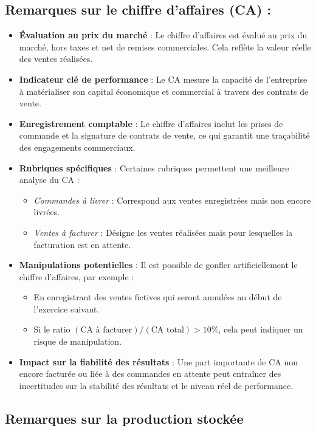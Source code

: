 \documentclass[a4paper, 12pt]{report}
\begin{document}
\subsection{Remarques sur le chiffre d'affaires (CA) :}
\begin{itemize}
	\item \textbf{Évaluation au prix du marché} : Le chiffre d'affaires est évalué au prix du marché, hors taxes et net de remises commerciales. Cela reflète la valeur réelle des ventes réalisées.
	\item \textbf{Indicateur clé de performance} : Le CA mesure la capacité de l'entreprise à matérialiser son capital économique et commercial à travers des contrats de vente.
	\item \textbf{Enregistrement comptable} : Le chiffre d'affaires inclut les prises de commande et la signature de contrats de vente, ce qui garantit une traçabilité des engagements commerciaux.
	\item \textbf{Rubriques spécifiques} : Certaines rubriques permettent une meilleure analyse du CA :
	\begin{itemize}
		\item \textit{Commandes à livrer} : Correspond aux ventes enregistrées mais non encore livrées.
		\item \textit{Ventes à facturer} : Désigne les ventes réalisées mais pour lesquelles la facturation est en attente.
	\end{itemize}
	\item \textbf{Manipulations potentielles} : Il est possible de gonfler artificiellement le chiffre d'affaires, par exemple :
	\begin{itemize}
		\item En enregistrant des ventes fictives qui seront annulées au début de l'exercice suivant.
		\item Si le ratio \((\text{CA à facturer}) / (\text{CA total}) > 10\%\), cela peut indiquer un risque de manipulation.
	\end{itemize}
	\item \textbf{Impact sur la fiabilité des résultats} : Une part importante de CA non encore facturée ou liée à des commandes en attente peut entraîner des incertitudes sur la stabilité des résultats et le niveau réel de performance.
\end{itemize}


\subsection{Remarques sur la production stockée}
\end{document}

